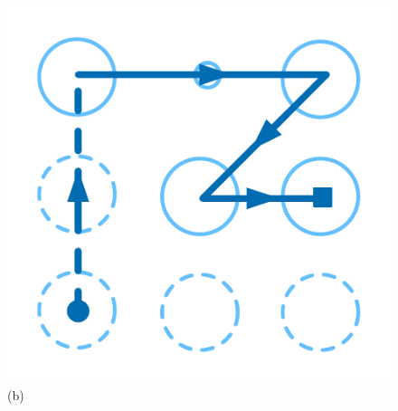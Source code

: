 \begin{figure}[!t]
{\begin{minipage}[t]{0.11\textwidth}
                \includegraphics[width=\textwidth]{fig/protection2.pdf}\\
                \centering \footnotesize (b)
             \end{minipage}
        }
        \hspace{0.3cm}
\end{figure}
